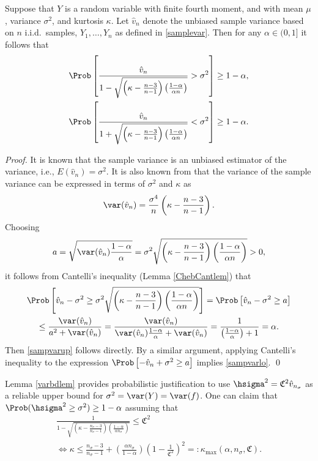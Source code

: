 \documentclass[graybox]{svmult}
\newcommand{\hv}{\hat{v}}
\newcommand{\fudge}{\mathfrak{C}}
\begin{document}
\begin{lemma} \label{varbdlem}  Suppose that $Y$ is a random variable with finite fourth moment, and with mean $\mu$, variance $\sigma^2$, and kurtosis $\kappa$.  Let $\hv_{n}$ denote the unbiased sample variance based on $n$ i.i.d.\ samples, $Y_1, \ldots, Y_n$ as defined in \eqref{samplevar}.  Then for any $\alpha \in (0,1]$ it follows that
\begin{subequations} \label{sampvarbd}
\begin{gather} \label{sampvarup}
\Prob \left[\frac{\hv_{n}}{1 - \sqrt{\left ( \kappa  - \frac{n-3}{n-1}\right)\left(\frac{1-\alpha}{\alpha n}\right)}} > \sigma^2 \right] \ge 1 - \alpha, \\
\label{sampvarlo}
\Prob \left[\frac{\hv_{n}}{1 + \sqrt{\left ( \kappa  - \frac{n-3}{n-1}\right)\left(\frac{1-\alpha}{\alpha n}\right)}} < \sigma^2 \right] \ge 1 - \alpha.
\end{gather}
\end{subequations}
\end{lemma}

\begin{proof} It is known that the sample variance is an unbiased estimator of the variance, i.e., $E(\hv_n)=\sigma^2$.  It is also known from \cite[(7.16)]{Mil86} that the variance of the sample variance can be expressed in terms of $\sigma^2$ and $\kappa$ as
\[
\var(\hv_n) = \frac{\sigma^4}{n} \left ( \kappa  - \frac{n-3}{n-1} \right).
\]
Choosing
$$a=\sqrt{\var(\hv_n) \frac{1-\alpha}{\alpha} } = \sigma^2\sqrt{\left(\kappa-\frac{n-3}{n-1}\right)\left(\frac{1-\alpha}{\alpha n}\right)} >0,
$$
it follows from Cantelli's inequality (Lemma \ref{ChebCantlem})  that
\begin{multline*}
\Prob\left[\hv_n-\sigma^2 \geq
\sigma^2\sqrt{\left(\kappa-\frac{n-3}{n-1}\right)\left(\frac{1-\alpha}{\alpha n}\right)} \right]  = \Prob\left[\hv_n-\sigma^2 \geq
a \right]\\
 \leq \frac{\var(\hv_n)}{a^2+\var(\hv_n)} 
=\frac{\var(\hv_n)}{\var(\hv_n) \frac{1-\alpha}{\alpha}+\var(\hv_n)}  
=\frac{1}{\left(\frac{1-\alpha}{\alpha}\right)+1}=\alpha.
\end{multline*}
Then \eqref{sampvarup} follows directly.  By a similar argument, applying Cantelli's inequality to the expression $\Prob\left[-\hv_n+\sigma^2 \ge a \right]$ implies  \eqref{sampvarlo}. \qed
\end{proof}

Lemma \ref{varbdlem} provides probabilistic justification to use $\hsigma^2 = \fudge^2 \hv_{n_{\sigma}}$ as a reliable upper bound for $\sigma^2=\var(Y)=\var(f)$.  One can claim that $\Prob(\hsigma^2 \ge \sigma^2) \ge 1-\alpha$ assuming that
\begin{multline}
\frac{1}{1 - \sqrt{\left ( \kappa  - \frac{n_{\sigma}-3}{n_{\sigma}-1}\right)\left(\frac{1-\alpha}{\alpha n_{\sigma}}\right)}} \le \fudge^2
\\
\iff \kappa \le \frac{n_{\sigma}-3}{n_{\sigma}-1} + \left(\frac{ \alpha n_{\sigma}}{1-\alpha}\right) \left(1 - \frac{1}{\fudge^2}\right)^2 =: \kappa_{\max} (\alpha,n_{\sigma},\fudge). \label{kappamaxdef}
\end{multline}
\end{document}
